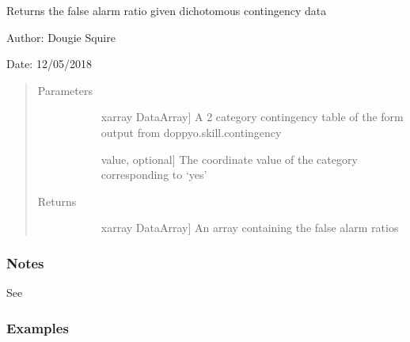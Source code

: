 \documentclass[letterpaper,10pt,english]{sphinxmanual}
\begin{document}

\begin{fulllineitems}
\label{\detokenize{skill_doc:skill.false_alarm_ratio}}
Returns the false alarm ratio given dichotomous contingency data

\begin{DUlineblock}{0em}
\item[] Author: Dougie Squire
\item[] Date: 12/05/2018
\end{DUlineblock}
\begin{quote}\begin{description}
\item[{Parameters}] \leavevmode\begin{description}
\item[{}] \leavevmode{[}xarray DataArray{]}
A 2 category contingency table of the form output from doppyo.skill.contingency

\item[{}] \leavevmode{[}value, optional{]}
The coordinate value of the category corresponding to ‘yes’

\end{description}

\item[{Returns}] \leavevmode\begin{description}
\item[{}] \leavevmode{[}xarray DataArray{]}
An array containing the false alarm ratios

\end{description}

\end{description}\end{quote}
\subsubsection*{Notes}

See 
\subsubsection*{Examples}


\end{fulllineitems}
\end{document}
